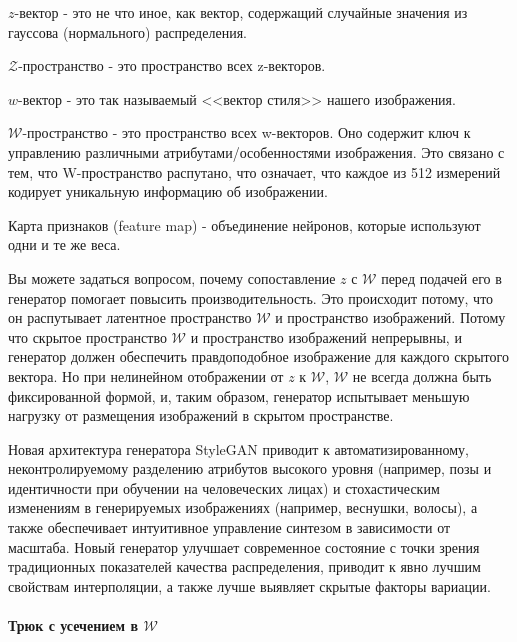 \begin{definition}
    $z$-вектор - это не что иное, как вектор, содержащий случайные значения из гауссова (нормального) распределения.
\end{definition}
\begin{definition}
    $\mathcal{Z}$-пространство - это пространство всех z-векторов.
\end{definition}
\begin{definition}
    $w$-вектор - это так называемый <<вектор стиля>> нашего изображения.
\end{definition}
\begin{definition}
    $\mathcal{W}$-пространство - это пространство всех w-векторов. Оно содержит ключ к управлению различными атрибутами/особенностями изображения. Это связано с тем, что W-пространство распутано, что означает, что каждое из 512 измерений кодирует уникальную информацию об изображении.
\end{definition}
\begin{definition}
    Карта признаков (feature map) - объединение нейронов, которые используют одни и те же веса.
\end{definition}

Вы можете задаться вопросом, почему сопоставление $z$ с $\mathcal{W}$ перед подачей его в генератор помогает повысить производительность. Это происходит потому, что он распутывает латентное пространство $\mathcal{W}$ и пространство изображений. Потому что скрытое пространство $\mathcal{W}$ и пространство изображений непрерывны, и генератор должен обеспечить правдоподобное изображение для каждого скрытого вектора. Но при нелинейном отображении от $z$ к $\mathcal{W}$, $\mathcal{W}$ не всегда должна быть фиксированной формой, и, таким образом, генератор испытывает меньшую нагрузку от размещения изображений в скрытом пространстве.

Новая архитектура генератора StyleGAN приводит к автоматизированному, неконтролируемому разделению атрибутов высокого уровня (например, позы и идентичности при обучении на человеческих лицах) и стохастическим изменениям в генерируемых изображениях (например, веснушки, волосы), а также обеспечивает интуитивное управление синтезом в зависимости от масштаба. Новый генератор улучшает современное состояние с точки зрения традиционных показателей качества распределения, приводит к явно лучшим свойствам интерполяции, а также лучше выявляет скрытые факторы вариации\cite{StyleGAN}.

\paragraph{Трюк с усечением в $\mathcal{W}$}

